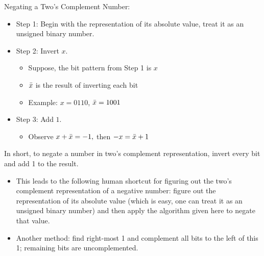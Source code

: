 \begin{frame}[fragile]
Negating a Two's Complement Number:
\begin{itemize}
\item Step 1: Begin with the representation of its absolute value, treat it
	as an unsigned binary number.
 \item Step 2: Invert $x$.
 \begin{itemize}
     \item Suppose, the bit pattern from Step 1 is $x$
     \item $\Bar x$ is the result of inverting each bit
    \item Example: $x = 0110$, $\Bar x = 1001$
 \end{itemize}
\item Step 3: Add $1$.
\begin{itemize}
    \item Observe $x + \Bar{x} = -1, $ then $-x = \Bar{x}+1$
\end{itemize}
\end{itemize}
\hfill
In short, to {\color{blue} negate a number in two's complement representation, invert
every bit and add 1 to the result.}

\BNotes\ifnum{}
\begin{itemize}
\item This leads to the following human shortcut for figuring out the two's
	complement representation of a negative number: figure out the
	representation of its absolute value (which is easy, one can treat it
	as an unsigned binary number) and then apply the algorithm given here
to negate that value.
\item Another method: find right-most 1 and complement all bits to the
	left of this 1; remaining bits are uncomplemented.
\end{itemize}
\fi\ENotes
\end{frame}

